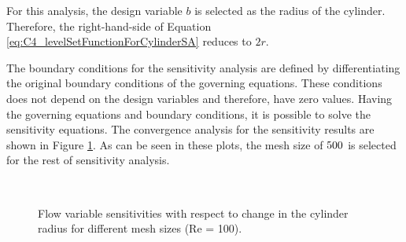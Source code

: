 For this analysis, the design variable $b$ is selected as the radius of the cylinder. Therefore, the right-hand-side of Equation \eqref{eq:C4_levelSetFunctionForCylinderSA} reduces to $2r$.

The boundary conditions for the sensitivity analysis are defined by differentiating the original boundary conditions of the governing equations. These conditions does not depend on the design variables and therefore, have zero values. Having the governing equations and boundary conditions, it is possible to solve the sensitivity equations. The convergence analysis for the sensitivity results are shown in Figure \ref{fig:C4_flowOverCylinderSAmeshConvergence}. As can be seen in these plots, the mesh size of $500 \time 375$ is selected for the rest of sensitivity analysis.

\begin{figure}[H]
    \centering
    \quad
    \\
    \caption{Flow variable sensitivities with respect to change in the cylinder radius for different mesh sizes (Re = 100).}
    \label{fig:C4_flowOverCylinderSAmeshConvergence}
\end{figure}

